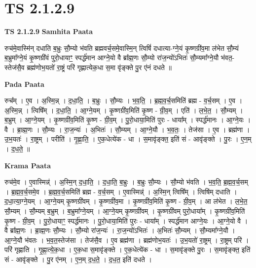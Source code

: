 \documentclass[17pt]{extarticle}
\begin{document}
\section{ TS 2.1.2.9 }

\textbf{TS 2.1.2.9 } \newline
\textbf{Samhita Paata} \newline

रुच॑मे॒वास्मि॑न् दधाति ब॒भ्रुः सौ॒म्यो भ॑वति ब्रह्मवर्च॒समे॒वास्मि॒न् त्विषिं॑ दधात्या-ग्ने॒यं कृ॒ष्णग्री॑व॒मा ल॑भेत सौ॒म्यं ब॒भ्रुमा᳚ग्ने॒यं कृ॒ष्णग्री॑वं पुरो॒धायाꣳ॒॒ स्पर्द्ध॑मान आग्ने॒यो वै ब्रा᳚ह्म॒णः सौ॒म्यो रा॑ज॒न्यो॑ऽभितः॑ सौ॒म्यमा᳚ग्ने॒यौ भ॑वत॒-स्तेज॑सै॒व ब्रह्म॑णोभ॒यतो॑ रा॒ष्ट्रं परि॑ गृह्णात्येक॒धा स॒मा वृ॑ङ्क्ते पु॒र ए॑नं दधते ॥ \newline

\textbf{Pada Paata} \newline

रुच᳚म् । ए॒व । अ॒स्मि॒न्न् । द॒धा॒ति॒ । ब॒भ्रुः । सौ॒म्यः । भ॒व॒ति॒ । ब्र॒ह्म॒व॒र्च॒समिति॑ ब्रह्म - व॒र्च॒सम् । ए॒व । अ॒स्मि॒न्न् । त्विषि᳚म् । द॒धा॒ति॒ । आ॒ग्ने॒यम् । कृ॒ष्णग्री॑व॒मिति॑ कृ॒ष्ण - ग्री॒व॒म् । एति॑ । ल॒भे॒त॒ । सौ॒म्यम् । ब॒भ्रुम् । आ॒ग्ने॒यम् । कृ॒ष्णग्री॑व॒मिति॑ कृ॒ष्ण - ग्री॒व॒म् । पु॒रो॒धाया॒मिति॑ पुरः - धाया᳚म् । स्पर्द्ध॑मानः । आ॒ग्ने॒यः । वै । ब्रा॒ह्म॒णः । सौ॒म्यः । रा॒ज॒न्यः॑ । अ॒भितः॑ । सौ॒म्यम् । आ॒ग्ने॒यौ । भ॒व॒तः॒ । तेज॑सा । ए॒व । ब्रह्म॑णा । उ॒भ॒यतः॑ । रा॒ष्ट्रम् । परीति॑ । गृ॒ह्णा॒ति॒ । ए॒क॒धेत्ये॑क - धा । स॒मावृ॑ङ्क्त॒ इति॑ सं - आवृ॑ङ्क्ते । पु॒रः । ए॒न॒म् । द॒ध॒ते॒ ॥  \newline


\textbf{Krama Paata} \newline

रुच॑मे॒व । ए॒वास्मिन्न्॑ । अ॒स्मि॒न् द॒धा॒ति॒ । द॒धा॒ति॒ ब॒भ्रुः । ब॒भ्रुः सौ॒म्यः । सौ॒म्यो भ॑वति । भ॒व॒ति॒ ब्र॒ह्म॒व॒र्च॒सम् । ब्र॒ह्म॒व॒र्च॒समे॒व । ब्र॒ह्म॒व॒र्च॒समिति॑ ब्रह्म - व॒र्च॒सम् । ए॒वास्मिन्न्॑ । अ॒स्मि॒न् त्विषि᳚म् । त्विषि॑म् दधाति । द॒धा॒त्या॒ग्ने॒यम् । आ॒ग्ने॒यम् कृ॒ष्णग्री॑वम् । कृ॒ष्णग्री॑व॒मा । कृ॒ष्णग्री॑व॒मिति॑ कृ॒ष्ण - ग्री॒व॒म् । आ ल॑भेत । ल॒भे॒त॒ सौ॒म्यम् । सौ॒म्यम् ब॒भ्रुम् । ब॒भ्रुमा᳚ग्ने॒यम् । आ॒ग्ने॒यम् कृ॒ष्णग्री॑वम् । कृ॒ष्णग्री॑वम् पुरो॒धाया᳚म् । कृ॒ष्णग्री॑व॒मिति॑ कृ॒ष्ण - ग्री॒व॒म् । पु॒रो॒धायाꣳ॒॒ स्पर्द्ध॑मानः । पु॒रो॒धाया॒मिति॑ पुरः - धाया᳚म् । स्पर्द्ध॑मान आग्ने॒यः । आ॒ग्ने॒यो वै । वै ब्रा᳚ह्म॒णः । ब्रा॒ह्म॒णः सौ॒म्यः । सौ॒म्यो रा॑ज॒न्यः॑ । रा॒ज॒न्यो॑ऽभितः॑ । अ॒भितः॑ सौ॒म्यम् । सौ॒म्यमा᳚ग्ने॒यौ । आ॒ग्ने॒यौ भ॑वतः । भ॒व॒त॒स्तेज॑सा । तेज॑सै॒व । ए॒व ब्रह्म॑णा । ब्रह्म॑णोभ॒यतः॑ । उ॒भ॒यतो॑ रा॒ष्ट्रम् । रा॒ष्ट्रम् परि॑ । परि॑ गृह्णाति । गृ॒ह्णा॒त्ये॒क॒धा । ए॒क॒धा स॒मावृ॑ङ्क्ते । ए॒क॒धेत्ये॑क - धा । स॒मावृ॑ङ्क्ते पु॒रः । स॒मावृ॑ङ्क्त॒ इति॑ सं - आवृ॑ङ्क्ते । पु॒र ए॑नम् । ए॒न॒म् द॒ध॒ते॒ । द॒ध॒त॒ इति॑ दधते । \newline
\end{document}
